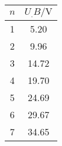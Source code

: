\label{tab:tabFranckHertz}
	\begin{tabular}{S[table-format=1.0]S[table-format=2.2]}
		\toprule
		{$n$} & {$U_.{B}/\si{\volt}$} \\
		 & 5.20 \\
		2 & 9.96 \\
		3 & 14.72 \\
		4 & 19.70 \\
		5 & 24.69 \\
		6 & 29.67 \\
		7 & 34.65 \\
		\bottomrule
	\end{tabular}
